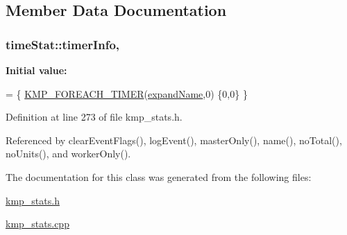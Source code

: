 \subsection{Member Data Documentation}
\hypertarget{classtimeStat_ab2fce6fab263ba89a398acf2dbe5b0d3}{
\subsubsection[{timer\-Info}]{ time\-Stat\-::timer\-Info\hspace{0.3cm}{\ttfamily [static]}, {\ttfamily [private]}}}\label{classtimeStat_ab2fce6fab263ba89a398acf2dbe5b0d3}
{\bfseries Initial value\-:}
\begin{DoxyCode}
= \{
    \hyperlink{kmp__stats_8h_accf71030e44454acab22210bb4a89d1b}{KMP\_FOREACH\_TIMER}(\hyperlink{kmp__stats_8cpp_a17949c412e2b08e907236b2d496ed7c1}{expandName},0)
    \{0,0\}
\}
\end{DoxyCode}


Definition at line 273 of file kmp\-\_\-stats.\-h.



Referenced by clear\-Event\-Flags(), log\-Event(), master\-Only(), name(), no\-Total(), no\-Units(), and worker\-Only().



The documentation for this class was generated from the following files\-:\begin{DoxyCompactItemize}
\item 
\hyperlink{kmp__stats_8h}{kmp\-\_\-stats.\-h}\item 
\hyperlink{kmp__stats_8cpp}{kmp\-\_\-stats.\-cpp}\end{DoxyCompactItemize}
